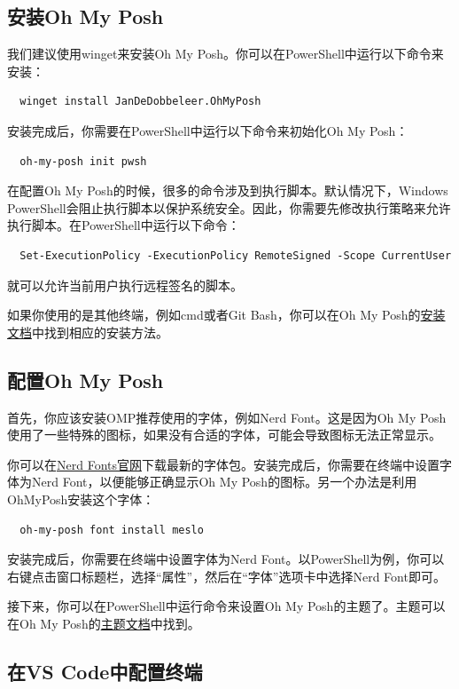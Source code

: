 \documentclass[../main.tex]{subfiles}
\begin{document}
\subsection{安装Oh My Posh}

我们建议使用winget来安装Oh My Posh。你可以在PowerShell中运行以下命令来安装：

\begin{verbatim}
  winget install JanDeDobbeleer.OhMyPosh
\end{verbatim}

安装完成后，你需要在PowerShell中运行以下命令来初始化Oh My Posh：
\begin{verbatim}
  oh-my-posh init pwsh
\end{verbatim}

在配置Oh My Posh的时候，很多的命令涉及到执行脚本。默认情况下，Windows PowerShell会阻止执行脚本以保护系统安全。因此，你需要先修改执行策略来允许执行脚本。在PowerShell中运行以下命令：
\begin{verbatim}
  Set-ExecutionPolicy -ExecutionPolicy RemoteSigned -Scope CurrentUser
\end{verbatim}
就可以允许当前用户执行远程签名的脚本。

如果你使用的是其他终端，例如cmd或者Git Bash，你可以在Oh My Posh的\href{https://ohmyposh.dev/docs/installation}{安装文档}中找到相应的安装方法。

\subsection{配置Oh My Posh}

首先，你应该安装OMP推荐使用的字体，例如Nerd Font。这是因为Oh My Posh使用了一些特殊的图标，如果没有合适的字体，可能会导致图标无法正常显示。

你可以在\href{https://www.nerdfonts.com/}{Nerd Fonts官网}下载最新的字体包。安装完成后，你需要在终端中设置字体为Nerd Font，以便能够正确显示Oh My Posh的图标。另一个办法是利用OhMyPosh安装这个字体：
\begin{verbatim}
  oh-my-posh font install meslo
\end{verbatim}

安装完成后，你需要在终端中设置字体为Nerd Font。以PowerShell为例，你可以右键点击窗口标题栏，选择“属性”，然后在“字体”选项卡中选择Nerd Font即可。

接下来，你可以在PowerShell中运行命令来设置Oh My Posh的主题了。主题可以在Oh My Posh的\href{https://ohmyposh.dev/docs/themes}{主题文档}中找到。 

\subsection{在VS Code中配置终端}
\end{document}
